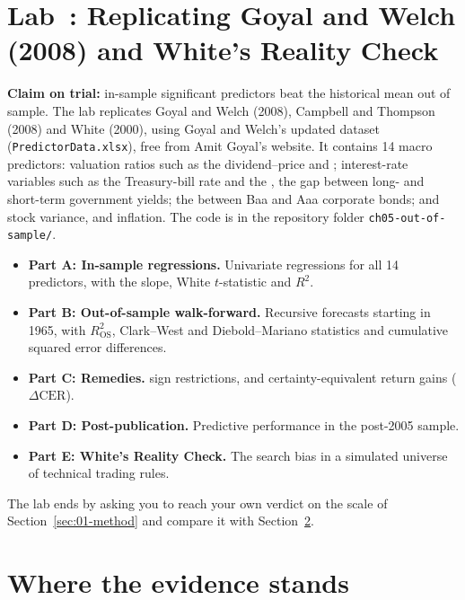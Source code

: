 \section{Lab~\thechapter: Replicating Goyal and Welch (2008) and White's Reality Check}
\label{sec:09-lab}

\textbf{Claim on trial:} in-sample significant predictors beat the historical mean out of sample. The lab replicates Goyal and Welch (2008), Campbell and Thompson (2008) and White (2000), using Goyal and Welch's updated dataset (\texttt{PredictorData.xlsx}), free from Amit Goyal's website. It contains 14 macro predictors: valuation ratios such as the dividend--price and ; interest-rate variables such as the Treasury-bill rate and the , the gap between long- and short-term government yields; the  between Baa and Aaa corporate bonds; and stock variance,  and inflation. The code is in the repository folder \texttt{ch05-out-of-sample/}.

\begin{itemize}
  \item \textbf{Part A: In-sample regressions.} Univariate regressions for all 14 predictors, with the slope, White $t$-statistic and $R^2$.
  \item \textbf{Part B: Out-of-sample walk-forward.} Recursive forecasts starting in 1965, with $R^2_{\text{OS}}$, Clark--West and Diebold--Mariano statistics and cumulative squared error differences.
  \item \textbf{Part C: Remedies.}  sign restrictions,  and certainty-equivalent return gains ($\Delta \text{CER}$).
  \item \textbf{Part D: Post-publication.} Predictive performance in the post-2005 sample.
  \item \textbf{Part E: White's Reality Check.} The search bias in a simulated universe of technical trading rules.
\end{itemize}

The lab ends by asking you to reach your own verdict on the scale of Section~\ref{sec:01-method} and compare it with Section~\ref{sec:09-verdict}.

\section{Where the evidence stands}
\label{sec:09-verdict}

